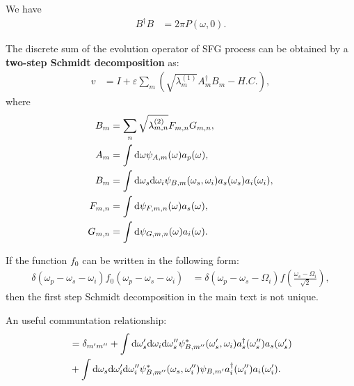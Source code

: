 \documentclass[../../note.tex]{subfiles}
\begin{document}
\begin{lemma}
    We have
    \begin{align}
        B^\dagger B
        &= 2 \pi P(\omega, 0).
    \end{align}
\end{lemma}

\begin{lemma}
    The discrete sum of the evolution operator of SFG process can be obtained by a \textbf{two-step Schmidt decomposition} as:
    \begin{align}
        v
        &= I + \varepsilon \sum_{m}\left(\sqrt{\lambda_m^{(1)}} A_m^\dagger B_m - H.C. \right),
    \end{align}
    where 
    \begin{align}
        B_m
        &= \sum_n \sqrt{\lambda_{m,n}^{(2)}} F_{m,n} G_{m,n}, \\
        A_m
        &= \int {\rm d}\omega \psi_{A,m}(\omega)a_p(\omega), \\
        B_m
        &= \int {\rm d}\omega_s{\rm d}\omega_i \psi_{B,m}(\omega_s, \omega_i) a_s(\omega_s)a_i(\omega_i), \\
        F_{m,n}
        &= \int{\rm d}\psi_{F,m,n}(\omega) a_s(\omega), \\
        G_{m,n}
        &= \int {\rm d}\psi_{G,m,n}(\omega)a_i(\omega).
    \end{align} 
\end{lemma}

\begin{lemma}
    If the function $f_0$ can be written in the following form:
    \begin{align}
        \delta(\omega_p - \omega_s -\omega_i) f_0(\omega_p -\omega_s -\omega_i)
        &= \delta(\omega_p - \omega_s - \Omega_i) f(\frac{\omega_s-\Omega_i}{\sqrt{2}}),
    \end{align}
    then the first step Schmidt decomposition in the main text is not unique.
\end{lemma}

\begin{lemma}
    \label{lemma: an useful communtation relationship}
    An useful communtation relationship:
    \begin{align}
        [B_{m'},B^\dagger_{m''}]
        &= \delta_{m'm''} + \int {\rm d}\omega_s'{\rm d}\omega_i{\rm d}\omega_s''\psi^{\ast}_{B,m''}(\omega_s',\omega_i)a^\dagger_{s}(\omega_s'')a_s(\omega_s') \\
        &+\int {\rm d}\omega_s{\rm d}\omega_i'{\rm d}\omega_i''\psi^{\ast}_{B,m''}(\omega_s,\omega_i'')\psi_{B,m'}a^\dagger_{i}(\omega_i'')a_i(\omega_i').
    \end{align}
\end{lemma}
\end{document}
